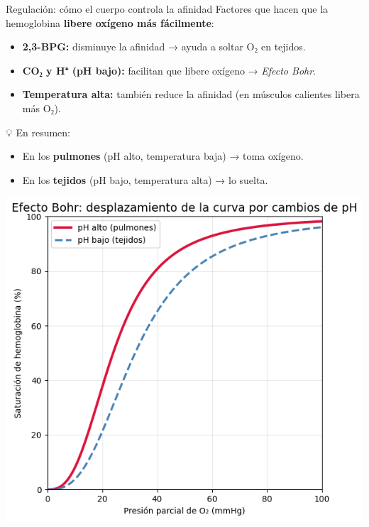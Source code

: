 \documentclass[
  ignorenonframetext,
]{beamer}
\providecommand{\tightlist}{%
  \setlength{\itemsep}{0pt}\setlength{\parskip}{0pt}}
\begin{document}
\begin{frame}{Regulación: cómo el cuerpo controla la afinidad}
\label{regulaciuxf3n-cuxf3mo-el-cuerpo-controla-la-afinidad}
Factores que hacen que la hemoglobina \textbf{libere oxígeno más
fácilmente}:

\begin{itemize}
\tightlist
\item
  \textbf{2,3-BPG:} disminuye la afinidad → ayuda a soltar O₂ en
  tejidos.\\
\item
  \textbf{CO₂ y H⁺ (pH bajo):} facilitan que libere oxígeno →
  \emph{Efecto Bohr}.\\
\item
  \textbf{Temperatura alta:} también reduce la afinidad (en músculos
  calientes libera más O₂).
\end{itemize}

💡 En resumen:

\begin{itemize}
\tightlist
\item
  En los \textbf{pulmones} (pH alto, temperatura baja) → toma oxígeno.\\
\item
  En los \textbf{tejidos} (pH bajo, temperatura alta) → lo suelta.
\end{itemize}

\begin{center}
\includegraphics[width=0.3\linewidth,height=\textheight,keepaspectratio]{PH.png}
\end{center}
\end{frame}
\end{document}
